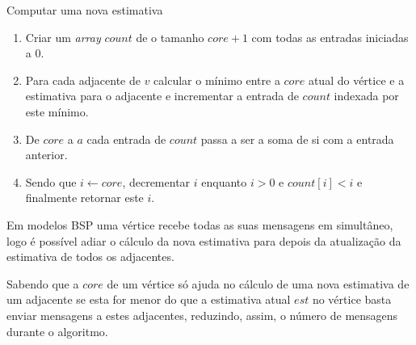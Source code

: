 \begin{algorithm}
\caption{Computar uma nova estimativa}

\begin{enumerate}
	\item Criar um \textit{array} $count$ de o tamanho $core+1$ com todas as entradas iniciadas a $0$.
	\item Para cada adjacente de $v$ calcular o mínimo entre a $core$ atual do vértice e a estimativa para o adjacente e incrementar a entrada de $count$ indexada por este mínimo.
	\item De $core$ a $a$ cada entrada de $count$ passa a ser a soma de si com a entrada anterior.
	\item Sendo que $i \gets core$, decrementar $i$ enquanto $i > 0$ e $count[i] < i$ e finalmente retornar este $i$.
\end{enumerate}
\end{algorithm}
Em modelos BSP uma vértice recebe todas as suas mensagens em simultâneo, logo é possível adiar o cálculo da nova estimativa para depois da atualização da estimativa de todos os adjacentes. 

Sabendo que a $core$ de um vértice só ajuda no cálculo de uma nova estimativa de um adjacente se esta for menor do que a estimativa atual $est$ no vértice basta enviar mensagens a estes adjacentes, reduzindo, assim, o número de mensagens durante o algoritmo.



%
%

